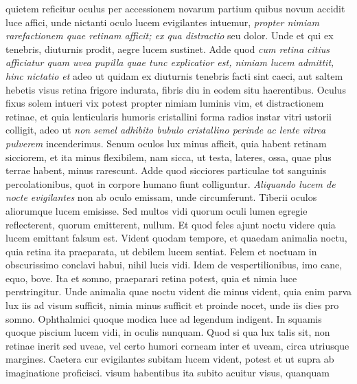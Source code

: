 quietem reficitur oculus per accessionem novarum partium quibus novum accidit luce affici, unde nictanti oculo lucem evigilantes intuemur, \textit{propter nimiam rarefactionem quae retinam afficit; ex qua distractio } seu dolor. Unde et qui ex tenebris, diuturnis prodit, aegre lucem sustinet. Adde quod \textit{cum retina citius afficiatur quam uvea pupilla quae tunc explicatior est, nimiam lucem admittit, hinc nictatio\protect{} et } adeo ut quidam ex diuturnis tenebris facti sint caeci, aut saltem hebetis visus retina frigore indurata, fibris diu in eodem situ haerentibus. Oculus fixus solem intueri vix potest propter nimiam luminis vim, et distractionem retinae, et quia lenticularis humoris\protect{} cristallini forma radios instar vitri ustorii colligit, adeo ut \textit{non semel adhibito bubulo cristallino perinde ac lente vitrea pulverem } incenderimus. Senum oculos lux minus afficit, quia habent retinam sicciorem, et ita minus flexibilem, nam sicca, ut testa\protect{}, lateres\protect{}, ossa\protect{}, quae plus terrae habent, minus rarescunt. Adde quod sicciores particulae tot sanguinis percolationibus, quot in corpore humano fiunt colliguntur.
\pend 
\count{}
\count{}
\count{}
\pstart
\textit{Aliquando lucem de nocte evigilantes } non ab oculo emissam, unde circumferunt. Tiberii\protect{} oculos aliorumque lucem emisisse. Sed multos vidi quorum oculi lumen egregie reflecterent, quorum emitterent, nullum. Et quod feles ajunt noctu videre quia lucem emittant falsum est. Vident quodam tempore, et quaedam animalia noctu, quia retina ita praeparata, ut debilem lucem sentiat. Felem\protect{} et noctuam in obscurissimo conclavi habui, nihil lucis vidi. Idem de vespertilionibus, imo cane\protect{}, equo\protect{}, bove\protect{}. Ita et somno, praeparari retina potest, quia et nimia luce perstringitur. Unde animalia\protect{} quae noctu vident die minus vident, quia enim parva lux iis ad visum sufficit, nimia minus sufficit et proinde nocet, unde iis dies pro somno. Ophthalmici quoque modica luce ad legendum indigent. In squamis quoque piscium lucem vidi, in oculis nunquam. Quod si qua lux talis sit, non retinae inerit sed uveae, vel certo humori corneam\protect{} inter et uveam\protect{}, circa utriusque margines. Caetera cur evigilantes subitam lucem vident, potest et ut supra ab imaginatione proficisci.  visum habentibus ita subito acuitur visus, quanquam
